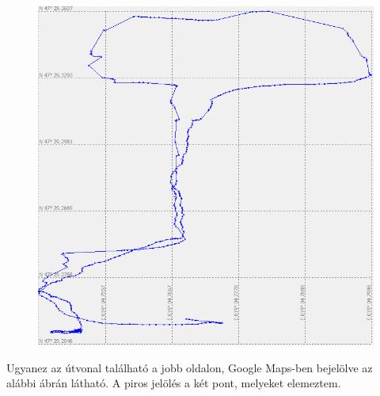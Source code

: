 \documentclass[10pt, conference,a4paper]{ITKproc}
\begin{document}
\begin{figure}[h]
\includegraphics[scale=0.4]{utvonal_visGPS}
\centering

\end{figure}


Ugyanez az útvonal található a jobb oldalon, Google Maps-ben bejelölve az alábbi ábrán látható. A piros jelölés a két pont, melyeket elemeztem. 
\end{document}
